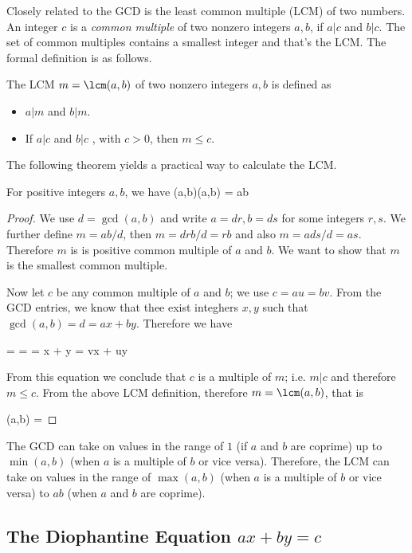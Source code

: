 Closely related to the GCD is the least common multiple (LCM) of two numbers. An integer $c$ is a \emph{common multiple} of two nonzero integers $a, b$, if $a | c$ and $b | c$. The set of common multiples contains a smallest integer and that's the LCM. The formal definition is as follows.

The LCM $m = \lcm(a,b)$ of two nonzero integers $a, b$ is defined as
\begin{itemize}
\item $a|m$ and $b|m$.
\item If $a|c$ and $b|c$ , with $c > 0$, then $m \leq c$.
\end{itemize}

The following theorem yields a practical way to calculate the LCM.

\begin{theorem}
  For positive integers $a, b$, we have
  \bee
  \gcd(a,b)\lcm(a,b) = ab
  \eee
\end{theorem}

\begin{proof}
  We use $d = \gcd(a,b)$ and write $a = dr, b = ds$ for some integers $r,s$. We further define $m = ab / d$, then $m = dr b / d = rb$ and also $m = a ds / d = as$. Therefore $m$ is is positive common multiple of $a$ and $b$. We want to show that $m$ is the smallest common multiple.

  Now let $c$ be any common multiple of $a$ and $b$; we use $c = au = bv$. From the GCD entries, we know that thee exist integhers $x, y$ such that $\gcd(a,b) = d = ax + by$. Therefore we have

  \bee
   =  =  = x + y = vx + uy
  \eee

  From this equation we conclude that $c$ is a multiple of $m$; i.e. $m | c$ and therefore $m \leq c$. From the above LCM definition, therefore $m = \lcm(a,b)$, that is

  \bee
  \lcm(a,b) = 
  \eee
\end{proof}

The GCD can take on values in the range of $1$ (if $a$ and $b$ are coprime) up to $\min(a,b)$ (when $a$ is a multiple of $b$ or vice versa). Therefore, the LCM can take on values in the range of $\max(a,b)$ (when $a$ is a multiple of $b$ or vice versa) to $ab$ (when $a$ and $b$ are coprime).

\subsection{The Diophantine Equation $ax + by = c$}

